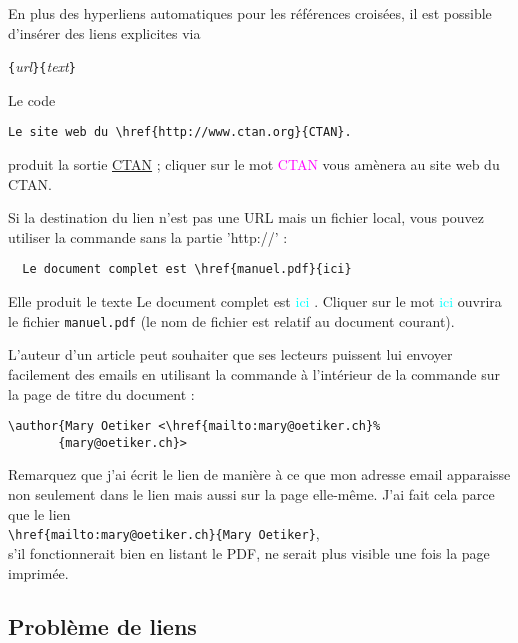 \vspace{\baselineskip}

En plus des hyperliens automatiques pour les références croisées, il
est possible d'insérer des liens explicites via
\begin{lscommand}
\verb|{|\emph{url}\verb|}{|\emph{text}\verb|}|
\end{lscommand}

Le code
\begin{code}
\begin{verbatim}
Le site web du \href{http://www.ctan.org}{CTAN}.
\end{verbatim}
\end{code}
produit la sortie \og \href{http://www.ctan.org}{CTAN} \fg{}; cliquer
sur le mot \og \textcolor{magenta}{CTAN} \fg{} vous amènera au site
web du CTAN.

Si la destination du lien n'est pas une URL mais un fichier local,
vous pouvez utiliser la commande  sans la partie 'http://' :
\begin{verbatim}
  Le document complet est \href{manuel.pdf}{ici}
\end{verbatim}
Elle produit le texte \og Le document complet est
\textcolor{cyan}{ici} \fg{}. Cliquer sur le mot \og
\textcolor{cyan}{ici} \fg{} ouvrira le fichier \texttt{manuel.pdf} (le
nom de fichier est relatif au document courant).

L'auteur d'un article peut souhaiter que ses lecteurs puissent lui
envoyer facilement des emails en utilisant la commande  à
l'intérieur de la commande  sur la page de titre du
document :
\begin{code}
\begin{verbatim}
\author{Mary Oetiker <\href{mailto:mary@oetiker.ch}%
       {mary@oetiker.ch}>
\end{verbatim}
\end{code}
Remarquez que j'ai écrit le lien de manière à ce que mon adresse email
apparaisse non seulement dans le lien mais aussi sur la page
elle-même. J'ai fait cela parce que le lien\\
\verb+\href{mailto:mary@oetiker.ch}{Mary Oetiker}+,\\
s'il fonctionnerait bien en listant le PDF, ne serait plus visible une fois
la page imprimée.

\subsection{Problème de liens}

